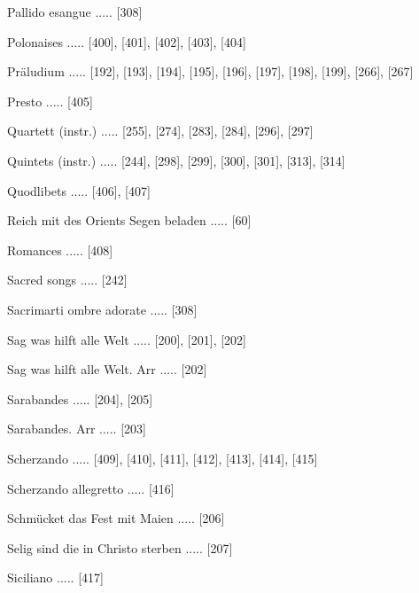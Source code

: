 \documentclass[twocolumn, 12pt]{book}
\begin{document}
\newline 
Pallido esangue ..... [308]

\newline 
Polonaises ..... [400], [401], [402], [403], [404]

\newline 
Präludium ..... [192], [193], [194], [195], [196], [197], [198], [199], [266], [267]

\newline 
Presto ..... [405]

\newline 
Quartett (instr.) ..... [255], [274], [283], [284], [296], [297]

\newline 
Quintets (instr.) ..... [244], [298], [299], [300], [301], [313], [314]

\newline 
Quodlibets ..... [406], [407]

\newline 
Reich mit des Orients Segen beladen ..... [60]

\newline 
Romances ..... [408]

\newline 
Sacred songs ..... [242]

\newline 
Sacrimarti ombre adorate ..... [308]

\newline 
Sag was hilft alle Welt ..... [200], [201], [202]

\newline 
Sag was hilft alle Welt. Arr ..... [202]

\newline 
Sarabandes ..... [204], [205]

\newline 
Sarabandes. Arr ..... [203]

\newline 
Scherzando ..... [409], [410], [411], [412], [413], [414], [415]

\newline 
Scherzando allegretto ..... [416]

\newline 
Schmücket das Fest mit Maien ..... [206]

\newline 
Selig sind die in Christo sterben ..... [207]

\newline 
Siciliano ..... [417]
\end{document}
